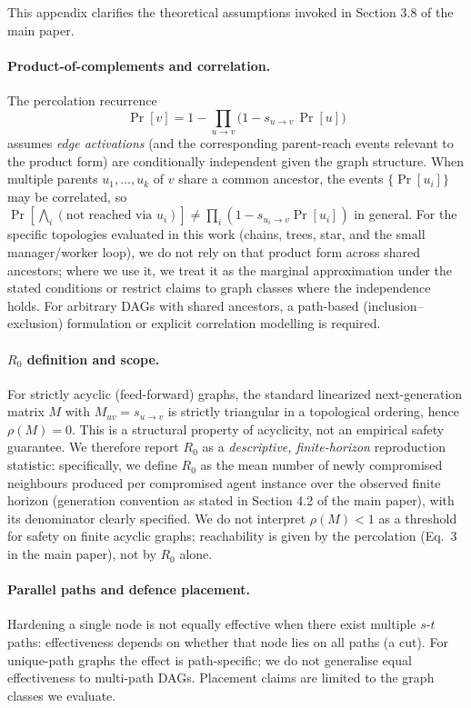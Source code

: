 \documentclass[sigconf,anonymous]{aamas}
\begin{document}
This appendix clarifies the theoretical assumptions invoked in Section 3.8 of the
main paper.

\paragraph{Product-of-complements and correlation.} The percolation recurrence
\[
\Pr[v] = 1 - \prod_{u \to v}\!\bigl(1 - s_{u\to v}\,\Pr[u]\bigr)
\]
assumes \emph{edge activations} (and the corresponding parent-reach events relevant to the
product form) are conditionally independent given the graph structure. When multiple
parents $u_1,\ldots,u_k$ of $v$ share a common ancestor, the events $\{\Pr[u_i]\}$ may be
correlated, so $\Pr[\bigwedge_i (\text{not reached via }u_i)] \neq \prod_i (1 - s_{u_i\to v}\Pr[u_i])$
in general. For the specific topologies evaluated in this work (chains, trees, star,
and the small manager/worker loop), we do not rely on that product form across shared
ancestors; where we use it, we treat it as the marginal approximation under the stated
conditions or restrict claims to graph classes where the independence holds. For
arbitrary DAGs with shared ancestors, a path-based (inclusion--exclusion) formulation
or explicit correlation modelling is required.

\paragraph{$R_0$ definition and scope.} For strictly acyclic (feed-forward) graphs, the
standard linearized next-generation matrix $M$ with $M_{uv}=s_{u\to v}$ is strictly
triangular in a topological ordering, hence $\rho(M)=0$. This is a structural property of
acyclicity, not an empirical safety guarantee. We therefore report $R_0$ as a
\emph{descriptive, finite-horizon} reproduction statistic: specifically, we define
$R_0$ as the mean number of newly compromised neighbours produced per compromised agent
instance over the observed finite horizon (generation convention as stated in
Section 4.2 of the main paper), with its denominator clearly specified. We do not
interpret $\rho(M)<1$ as a threshold for safety on finite acyclic graphs; reachability
is given by the percolation (Eq.~3 in the main paper), not by $R_0$ alone.

\paragraph{Parallel paths and defence placement.} Hardening a single node is not
equally effective when there exist multiple $s$-$t$ paths: effectiveness depends on
whether that node lies on all paths (a cut). For unique-path graphs the effect is
path-specific; we do not generalise equal effectiveness to multi-path DAGs. Placement
claims are limited to the graph classes we evaluate.
\end{document}
